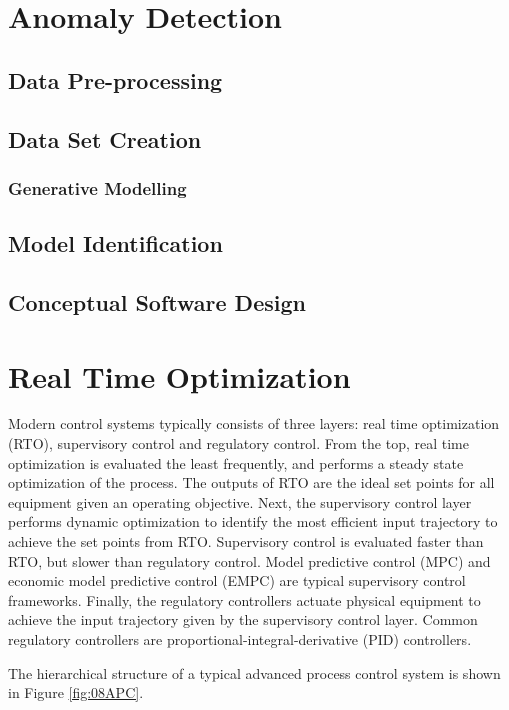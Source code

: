 \section{Anomaly Detection}
\subsection{Data Pre-processing}
\subsection{Data Set Creation}
\subsubsection{Generative Modelling}
\subsection{Model Identification}
\subsection{Conceptual Software Design}

\section{Real Time Optimization}
Modern control systems typically consists of three layers: real time optimization (RTO), supervisory control and regulatory control.  From the top, real time optimization is evaluated the least frequently, and performs a steady state optimization of the process.  The outputs of RTO are the ideal set points for all equipment given an operating objective.  Next, the supervisory control layer performs dynamic optimization to identify the most efficient input trajectory to achieve the set points from RTO. Supervisory control is evaluated faster than RTO, but slower than regulatory control. Model predictive control (MPC) and economic model predictive control (EMPC) are typical supervisory control frameworks. Finally, the regulatory controllers actuate physical equipment to achieve the input trajectory given by the supervisory control layer.  Common regulatory controllers are proportional-integral-derivative (PID) controllers.

The hierarchical structure of a typical advanced process control system is shown in Figure \ref{fig:08APC}.

